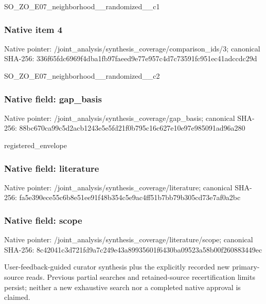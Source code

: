 \documentclass[10pt,a4paper]{article}
\begin{document}
\begingroup\raggedright\sloppy SO\_\allowbreak{}ZO\_\allowbreak{}E07\_\allowbreak{}neighborhood\_\allowbreak{}\_\allowbreak{}randomized\_\allowbreak{}\_\allowbreak{}c1\par\endgroup

\subsubsection{Native item 4}
Native pointer: /joint\_\allowbreak{}analysis/synthesis\_\allowbreak{}coverage/comparison\_\allowbreak{}ids/3; canonical SHA-256: 336f65fdc6969f4dba1fb97faeed9e77e957c4d7c73591fc951ec41adccdc29d

\begingroup\raggedright\sloppy SO\_\allowbreak{}ZO\_\allowbreak{}E07\_\allowbreak{}neighborhood\_\allowbreak{}\_\allowbreak{}randomized\_\allowbreak{}\_\allowbreak{}c2\par\endgroup

\subsubsection{Native field: gap\_\allowbreak{}basis}
Native pointer: /joint\_\allowbreak{}analysis/synthesis\_\allowbreak{}coverage/gap\_\allowbreak{}basis; canonical SHA-256: 88bc670ca99c5d2acb1243e5e5fd21f0b795c16c627e10e97e985091ad96a280

\begingroup\raggedright\sloppy registered\_\allowbreak{}envelope\par\endgroup

\subsubsection{Native field: literature}
Native pointer: /joint\_\allowbreak{}analysis/synthesis\_\allowbreak{}coverage/literature; canonical SHA-256: fa5e390ece55c6b8e51ee91f48b354c5e9ac4ff51b7bb79b305cd73e7af0a2bc

\subsubsection{Native field: scope}
Native pointer: /joint\_\allowbreak{}analysis/synthesis\_\allowbreak{}coverage/literature/scope; canonical SHA-256: 8c42041c3d721fd9a7c249e43a89935601f6430ba09523a58b00f260883449ec

\begingroup\raggedright\sloppy User-feedback-guided curator synthesis plus the explicitly recorded new primary-source reads. Previous partial searches and retained-source recertification limits persist;\allowbreak{} neither a new exhaustive search nor a completed native approval is claimed.\par\endgroup
\end{document}
